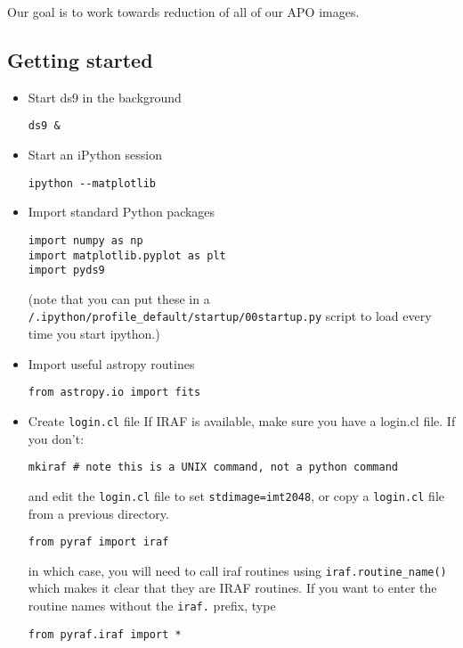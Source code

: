 \documentclass{article}
\begin{document}
Our goal is to work towards reduction of all of our APO images.

\subsection*{Getting started}
\begin{itemize}
\item Start ds9 in the background
\begin{verbatim}
ds9 &
\end{verbatim}
\item Start an iPython session
\begin{verbatim}
ipython --matplotlib
\end{verbatim}

\item Import standard Python packages
\begin{verbatim}
import numpy as np
import matplotlib.pyplot as plt
import pyds9
\end{verbatim}
(note that you can put these in a
\texttt{/.ipython/profile\_default/startup/00startup.py}
script to load every time you start ipython.)

\item Import useful astropy routines
\begin{verbatim}
from astropy.io import fits
\end{verbatim}

\item Create \texttt{login.cl} file
If IRAF is available, make sure you have a login.cl file. If you don't:
\begin{verbatim}
mkiraf # note this is a UNIX command, not a python command
\end{verbatim}
and edit the \texttt{login.cl} file to set \texttt{stdimage=imt2048},
or copy a \texttt{login.cl} file from a previous directory.
\begin{verbatim}
from pyraf import iraf
\end{verbatim}
in which case, you will need to call iraf routines using
\texttt{iraf.routine\_name()}
which makes it clear that they are IRAF routines. If you want to
enter the routine names without the \texttt{iraf.} prefix, type
\begin{verbatim}
from pyraf.iraf import *
\end{verbatim}
\end{itemize}
\end{document}
